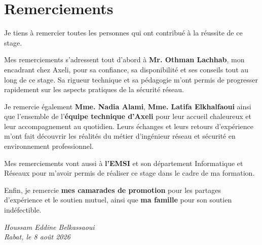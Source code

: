 \chapter*{Remerciements}

Je tiens à remercier toutes les personnes qui ont contribué à la réussite de ce stage.

Mes remerciements s'adressent tout d'abord à \textbf{Mr. Othman Lachhab}, mon encadrant chez Axeli, pour sa confiance, sa disponibilité et ses conseils tout au long de ce stage. Sa rigueur technique et sa pédagogie m'ont permis de progresser rapidement sur les aspects pratiques de la sécurité réseau.

Je remercie également \textbf{Mme. Nadia Alami}, \textbf{Mme. Latifa Elkhalfaoui} ainsi que l'ensemble de l'\textbf{équipe technique d'Axeli} pour leur accueil chaleureux et leur accompagnement au quotidien. Leurs échanges et leurs retours d'expérience m'ont fait découvrir les réalités du métier d'ingénieur réseau et sécurité en environnement professionnel.

Mes remerciements vont aussi à \textbf{l'EMSI} et son département Informatique et Réseaux pour m'avoir permis de réaliser ce stage dans le cadre de ma formation.

Enfin, je remercie \textbf{mes camarades de promotion} pour les partages d'expérience et le soutien mutuel, ainsi que \textbf{ma famille} pour son soutien indéfectible.

\vspace{1em}
\begin{flushright}
\textit{Houssam Eddine Belkassaoui}\\
\textit{Rabat, le 8 août 2026}
\end{flushright}
